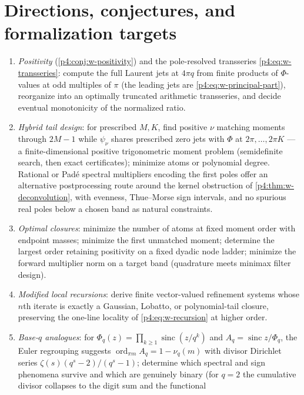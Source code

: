 \documentclass[11pt,oneside]{article}
\numberwithin{equation}{section}
\theoremstyle{definition}
\theoremstyle{remark}
\newcommand{\sinc}{\operatorname{sinc}}
\newcommand{\ord}{\operatorname{ord}}
\begin{document}
\section{Directions, conjectures, and formalization targets}
\label{p4:sec:w-directions}

\begin{enumerate}
\item \emph{Positivity} (\cref{p4:conj:w-positivity}) and the pole-resolved
      transseries \eqref{p4:eq:w-transseries}: compute the full Laurent jets
      at $4\pi q$ from finite products of $\Phi$-values at odd multiples
      of $\pi$ (the leading jets are \eqref{p4:eq:w-principal-part}),
      reorganize into an optimally truncated arithmetic transseries, and
      decide eventual monotonicity of the normalized ratio.
\item \emph{Hybrid tail design}: for prescribed $M,K$, find positive
      $\nu$ matching moments through $2M-1$ while $\psi_\nu$ shares
      prescribed zero jets with $\Phi$ at $2\pi,\ldots,2\pi K$ ---
      a finite-dimensional positive trigonometric moment problem
      (semidefinite search, then exact certificates); minimize atoms or
      polynomial degree.  Rational or Pad\'e spectral multipliers encoding
      the first poles offer an alternative postprocessing route around the
      kernel obstruction of \cref{p4:thm:w-deconvolution}, with evenness,
      Thue--Morse sign intervals, and no spurious real poles below a
      chosen band as natural constraints.
\item \emph{Optimal closures}: minimize the number of atoms at fixed
      moment order with endpoint masses; minimize the first unmatched
      moment; determine the largest order retaining positivity on a fixed
      dyadic node ladder; minimize the forward multiplier norm on a target
      band (quadrature meets minimax filter design).
\item \emph{Modified local recursions}: derive finite vector-valued
      refinement systems whose $n$th iterate is exactly a Gaussian,
      Lobatto, or polynomial-tail closure, preserving the one-line
      locality of \eqref{p4:eq:w-recursion} at higher order.
\item \emph{Base-$q$ analogues}: for $\Phi_q(z)=\prod_{k\ge1}\sinc(z/q^k)$
      and $A_q=\sinc z/\Phi_q$, the Euler regrouping suggests
      $\ord_{\pi m}A_q=1-\nu_q(m)$ with divisor Dirichlet series
      $\zeta(s)(q^s-2)/(q^s-1)$; determine which spectral and sign
      phenomena survive and which are genuinely binary (for $q=2$ the
      cumulative divisor collapses to the digit sum and the functional

\end{enumerate}
\end{document}
